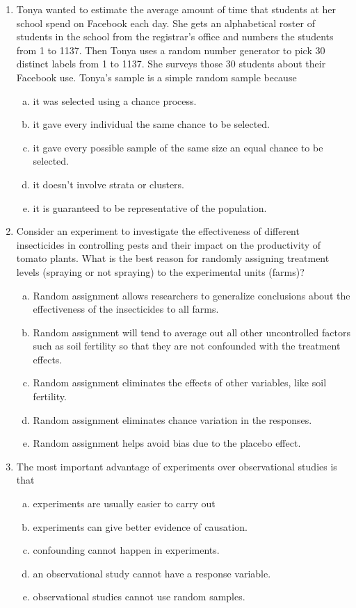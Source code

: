 \documentclass[a4paper,12pt,twoside]{book}
\begin{document}
\begin{enumerate}
 \item Tonya wanted to estimate the average amount of time that students at her school spend on Facebook each day. She gets an alphabetical roster of students in the school from the registrar’s office and numbers the students from 1 to 1137. Then Tonya uses a random number generator to pick 30 distinct labels from 1 to 1137. She surveys those 30 students about their Facebook use. Tonya’s sample is a simple random sample because
     \begin{enumerate}[(a)]
         \item  it was selected using a chance process.
         \item  it gave every individual the same chance to be  selected.
         \item  it gave every possible sample of the same size an equal chance to be selected.
         \item  it doesn’t involve strata or clusters.
         \item  it is guaranteed to be representative of the population.
     \end{enumerate}
 
 \item   Consider an experiment to investigate the effectiveness of different insecticides in controlling pests and their impact on the productivity of tomato plants. What is the best reason for randomly assigning treatment levels (spraying or not spraying) to the experimental units (farms)?
   \begin{enumerate}[(a)]
       \item  Random assignment allows researchers to generalize conclusions about the effectiveness of the insecticides to all farms. 
       \item Random assignment will tend to average out all other uncontrolled factors such as soil fertility so that they are not confounded with the treatment effects.
       \item Random assignment eliminates the effects of other variables, like soil fertility.
       \item Random assignment eliminates chance variation in the responses.
       \item Random assignment helps avoid bias due to the placebo effect.
   \end{enumerate}
 
 \item  The most important advantage of experiments over observational studies is that
     \begin{enumerate}[(a)]
         \item experiments are usually easier to carry out
         \item experiments can give better evidence of causation.
         \item confounding cannot happen in experiments.
         \item an observational study cannot have a response variable.
         \item observational studies cannot use random samples.
     \end{enumerate}             
         

\end{enumerate}
\end{document}
